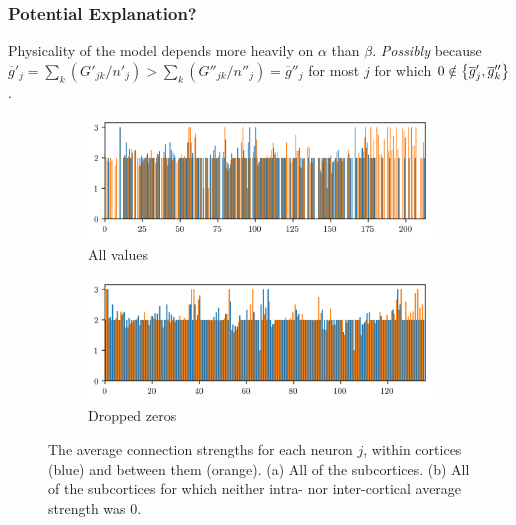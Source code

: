 \documentclass[hyperref={hidelinks}]{beamer}
\newcommand*{\hra}{\alpha}
\newcommand*{\hrb}{\beta}
\begin{document}
\begin{frame}
  \frametitle{Potential Explanation?}
  Physicality of the model depends more heavily on $\hra$ than $\hrb$.
  \textit{Possibly} because $\overline{g}'_{j} = \sum_{k} (G'_{jk}/n'_{j}) > \sum_{k} (G''_{jk}/n''_{j}) = \overline{g}''_{j}$ for most $j$ for which $0 \notin \Bqty{\overline{g}'_{j}, \overline{g}''_{k}}$.


  \begin{figure}[ht]
    \centering
    \begin{subfigure}{0.45\textwidth}
      \centering
      \includegraphics[width=\textwidth]{figure/g_over_n}
      \caption{All values}
      \label{fig:g_over_n}
    \end{subfigure} %
    \begin{subfigure}{0.45\textwidth}
      \centering
      \includegraphics[width=\textwidth]{figure/g_over_n_drop}
      \caption{Dropped zeros}
      \label{fig:g_over_n_drop}
    \end{subfigure}
    \caption[Average strengths]{The average connection strengths for each neuron $j$, within cortices (blue) and between them (orange).
      (a) All of the subcortices.
      (b) All of the subcortices for which neither intra- nor inter-cortical average strength was 0.
    }
    \label{fig:average_strengths}
  \end{figure}

\end{frame}
\end{document}

